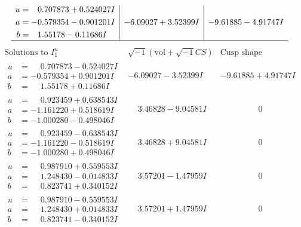 \documentclass[1p]{elsarticle_modified}
\theoremstyle{definition}
\newcommand{\I}{\sqrt{-1}}
\begin{document}
$$\begin{array}{c|c|c}
\begin{aligned}
u &= \phantom{-}0.707873 + 0.524027 I \\
a &= -0.579354 - 0.901201 I \\
b &= \phantom{-}1.55178 - 0.11686 I\end{aligned}
 & -6.09027 + 3.52399 I & -9.61885 - 4.91747 I\\
 \hline 
 \end{array}$$\newpage$$\begin{array}{c|c|c}  
\text{Solutions to }I^u_{1}& \I (\text{vol} + \sqrt{-1}CS) & \text{Cusp shape}\\
 \hline 
\begin{aligned}
u &= \phantom{-}0.707873 - 0.524027 I \\
a &= -0.579354 + 0.901201 I \\
b &= \phantom{-}1.55178 + 0.11686 I\end{aligned}
 & -6.09027 - 3.52399 I & -9.61885 + 4.91747 I \\ \hline\begin{aligned}
u &= \phantom{-}0.923459 + 0.638543 I \\
a &= -1.161220 + 0.518619 I \\
b &= -1.000280 - 0.498046 I\end{aligned}
 & \phantom{-}3.46828 - 9.04581 I & \phantom{-0.000000 } 0 \\ \hline\begin{aligned}
u &= \phantom{-}0.923459 - 0.638543 I \\
a &= -1.161220 - 0.518619 I \\
b &= -1.000280 + 0.498046 I\end{aligned}
 & \phantom{-}3.46828 + 9.04581 I & \phantom{-0.000000 } 0 \\ \hline\begin{aligned}
u &= \phantom{-}0.987910 + 0.559553 I \\
a &= \phantom{-}1.248430 - 0.014833 I \\
b &= \phantom{-}0.823741 + 0.340152 I\end{aligned}
 & \phantom{-}3.57201 - 1.47959 I & \phantom{-0.000000 } 0 \\ \hline\begin{aligned}
u &= \phantom{-}0.987910 - 0.559553 I \\
a &= \phantom{-}1.248430 + 0.014833 I \\
b &= \phantom{-}0.823741 - 0.340152 I\end{aligned}
 & \phantom{-}3.57201 + 1.47959 I & \phantom{-0.000000 } 0 \\ \hline\begin{aligned}

\end{aligned}
\end{array}$$
\end{document}
